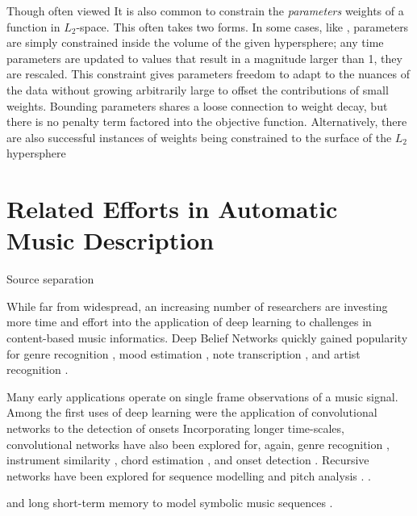 Though often viewed It is also common to constrain the \emph{parameters} weights of a function in $L_2$-space.
This often takes two forms.
In some cases, like \cite{HintonDropout}, parameters are simply constrained inside the volume of the given hypersphere; any time parameters are updated to values that result in a magnitude larger than 1, they are rescaled.
This constraint gives parameters freedom to adapt to the nuances of the data without growing arbitrarily large to offset the contributions of small weights.
Bounding parameters shares a loose connection to weight decay, but there is no penalty term factored into the objective function.
Alternatively, there are also successful instances of weights being constrained to the surface of the $L_2$ hypersphere \cite{LeCun}





\section{Related Efforts in Automatic Music Description}

Source separation

While far from widespread, an increasing number of researchers are investing more time and effort into the application of deep learning to challenges in content-based music informatics.
Deep Belief Networks quickly gained popularity for genre recognition \cite{Hamel2009}, mood estimation \cite{Schmidt2011}, note transcription \cite{Nam2011}, and artist recognition \cite{Dieleman2011}.

Many early applications operate on single frame observations of a music signal.
Among the first uses of deep learning were the application of convolutional networks to the detection of onsets \cite{Lacoste2007}
Incorporating longer time-scales, convolutional networks have also been explored for, again, genre recognition \cite{Li2010}, instrument similarity \cite{Humphrey2010}, chord estimation \cite{Humphrey2011, Humphrey2012b}, and onset detection \cite{Schluter2014}.
Recursive networks have been explored for sequence modelling \cite{Boulanger2013} and pitch analysis \cite{Sigtia2014}.
\cite{Cherla2014}.
\cite{Durand2015}

and long short-term memory to model symbolic music sequences \cite{Eck2008}.

